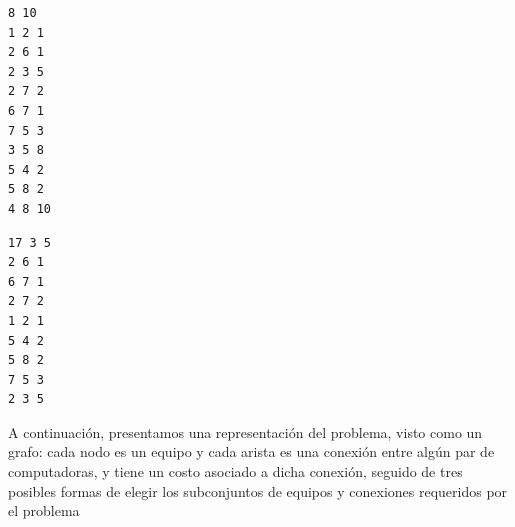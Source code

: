 \documentclass[11pt, a4paper, twoside]{article}
\begin{document}
\begin{minipage}[t]{0.4\textwidth}
\begin{Verbatim}[frame=single,framesep=1cm,label= Ejemplo de entrada: instancia 1]
8 10
1 2 1
2 6 1
2 3 5
2 7 2
6 7 1
7 5 3
3 5 8
5 4 2
5 8 2
4 8 10
\end{Verbatim}
\end{minipage}
\hfill
\begin{minipage}[t]{0.4\textwidth}
\begin{Verbatim}[frame=single,framesep=1cm,label= Ejemplo de salida: instancia 1]
17 3 5
2 6 1
6 7 1
2 7 2
1 2 1
5 4 2
5 8 2
7 5 3
2 3 5
\end{Verbatim}
\end{minipage}

A continuación, presentamos una representación del problema, visto como 
un grafo: cada nodo es un equipo y cada arista es una conexión entre 
algún par de computadoras, y tiene un costo asociado a dicha conexión, 
seguido de tres posibles formas de elegir los subconjuntos de equipos y 
conexiones requeridos por el problema
\end{document}
